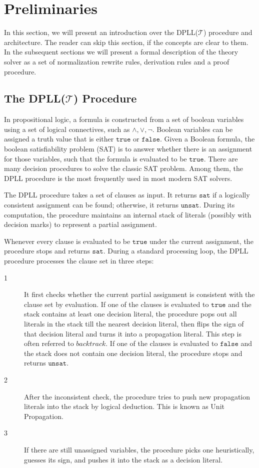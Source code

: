 
\section{Preliminaries}
\label{sec:Preliminaries}
In this section, we will present an introduction over the DPLL($\mathcal{T}$) procedure and architecture. The reader can skip this section, if the concepts are clear to them. In the subsequent sections we will present a formal description of the theory solver as a set of normalization rewrite rules, derivation rules and a proof procedure.

\subsection{The DPLL($\mathcal{T}$) Procedure}
\label{sec:dpllt procedure}
In propositional logic, a formula is constructed from a set of boolean variables using a set of logical connectives, such as \(\wedge, \vee, \neg\). Boolean variables can be assigned a truth value that is either  $\texttt{true}$ or  $\texttt{false}$. Given a Boolean formula, the boolean satisfiability problem (SAT) is to answer whether there is an assignment for those variables, such that the formula is evaluated to be $\texttt{true}$. There are many decision procedures to solve the classic SAT problem. Among them, the DPLL procedure is the most frequently used in most modern SAT solvers. 

The DPLL procedure takes a set of clauses as input. It returns $\texttt{sat}$ if a logically consistent assignment can be found; otherwise, it returns $\texttt{unsat}$. During its computation, the procedure maintains an internal stack of literals (possibly with decision marks) to represent a partial assignment. 

Whenever every clause is evaluated to be $\texttt{true}$ under the current assignment, the procedure stops and returns $\texttt{sat}$. During a standard processing loop, the DPLL procedure processes the clause set in three steps:

\begin{description}
	\item[1] It first checks whether the current partial assignment is consistent with the clause set by evaluation. If one of the clauses is evaluated to $\texttt{true}$ and the stack contains at least one decision literal, the procedure pops out all literals in the stack till the nearest decision literal, then flips the sign of that decision literal and turns it into a propagation literal. This step is often referred to \(backtrack\). If one of the clauses is evaluated to $\texttt{false}$ and the stack does not contain one decision literal, the procedure stops and returns $\texttt{unsat}$.
	
	\item[2] After the inconsistent check, the procedure tries to push new propagation literals into the stack by logical deduction. This is known as Unit Propagation.
	
	\item[3] If there are still unassigned variables, the procedure picks one heuristically, guesses its sign, and pushes it into the stack as a decision literal.
\end{description}

